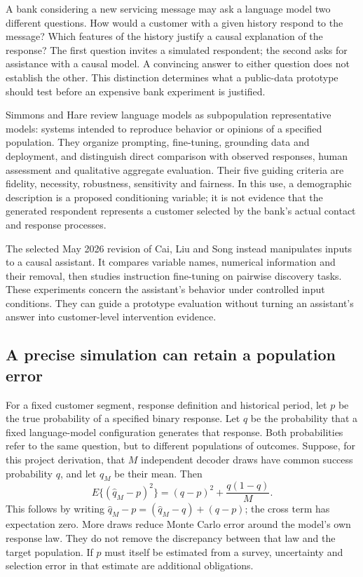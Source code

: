 A bank considering a new servicing message may ask a language model two
different questions. How would a customer with a given history respond to the
message? Which features of the history justify a causal explanation of the
response? The first question invites a simulated respondent; the second asks
for assistance with a causal model. A convincing answer to either question
does not establish the other. This distinction determines what a public-data
prototype should test before an expensive bank experiment is justified.

Simmons and Hare review language models as subpopulation representative
models: systems intended to reproduce behavior or opinions of a specified
population. They organize prompting, fine-tuning, grounding data and deployment,
and distinguish direct comparison with observed responses, human assessment
and qualitative aggregate evaluation. Their five guiding criteria are fidelity,
necessity, robustness, sensitivity and fairness. In this use, a demographic
description is a proposed conditioning variable; it is not evidence that the
generated respondent represents a customer selected by the bank's actual
contact and response processes.~\citep{exec20_population}

The selected May 2026 revision of Cai, Liu and Song instead manipulates inputs
to a causal assistant. It compares variable names, numerical information and
their removal, then studies instruction fine-tuning on pairwise discovery
tasks. These experiments concern the assistant's behavior under controlled
input conditions. They can guide a prototype evaluation without turning an
assistant's answer into customer-level intervention evidence.
\citep{exec20_attribution}

\subsection{A precise simulation can retain a population error}
\label{exec20:pa-population}
For a fixed customer segment, response definition and historical period, let
$p$ be the true probability of a specified binary response. Let $q$ be the
probability that a fixed language-model configuration generates that response.
Both probabilities refer to the same question, but to different populations
of outcomes. Suppose, for this project derivation, that $M$ independent
decoder draws have common success probability $q$, and let $\widehat q_M$
be their mean. Then
\begin{equation}
 E\{(\widehat q_M-p)^2\}
   =(q-p)^2+\frac{q(1-q)}{M}.
 \label{exec20:pa-mse}
\end{equation}
This follows by writing $\widehat q_M-p=(\widehat q_M-q)+(q-p)$;
the cross term has expectation zero. More draws reduce Monte Carlo error
around the model's own response law. They do not remove the discrepancy
between that law and the target population. If $p$ must itself be estimated
from a survey, uncertainty and selection error in that estimate are additional
obligations.~\citep{exec20_population_attribution_reference}

